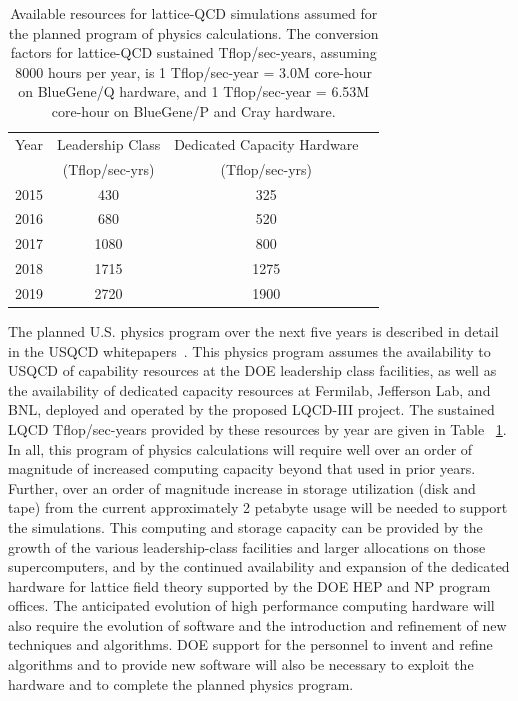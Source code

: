 \begin{table}[t]
\begin{center}
\caption{Available resources for lattice-QCD simulations assumed for the planned program of physics calculations.  The conversion factors for lattice-QCD sustained
Tflop/sec-years, assuming 8000 hours per year, is 1 Tflop/sec-year = 3.0M core-hour on BlueGene/Q hardware, and 1 Tflop/sec-year = 6.53M core-hour on BlueGene/P and Cray hardware. \vspace{1.5mm}}
\label{tab:fiveyear}
\begin{tabular}{lccc}
\hline\hline  
Year & Leadership Class  & Dedicated Capacity Hardware  \\[-0.75mm] 
& (Tflop/sec-yrs) & (Tflop/sec-yrs) \\[0.5mm] \hline
2015 & 430 & 325 \\
2016 & 680 & 520 \\
2017 & 1080 & 800 \\
2018 & 1715 & 1275 \\ 
2019 & 2720 & 1900 \\ \hline\hline
\end{tabular}
\end{center}
\end{table}

The planned U.S. physics program over the next five years is described in detail
in the USQCD
whitepapers~\cite{USQCD_EF_whitepaper13,USQCD_IF_whitepaper13,USQCD_NP_whitepaper13,USQCD_Thermo_whitepaper13}.
This physics program assumes the availability to USQCD of capability resources
at the DOE leadership class facilities, as well as the availability of dedicated
capacity resources at Fermilab, Jefferson Lab, and BNL, deployed and operated
by the proposed LQCD-III project.  The sustained LQCD Tflop/sec-years provided by
these resources by year are given in Table ~\ref{tab:fiveyear}. In all, this
program of physics calculations 
will require well over an order of magnitude of increased computing capacity
beyond that used in prior years.  Further, over an order of magnitude increase
in storage utilization (disk and tape) from the current approximately 2
petabyte usage will be needed to support the simulations.   This computing and
storage capacity can be provided by the growth
of the various leadership-class facilities and larger allocations on those
supercomputers, and by the continued availability and expansion of the
dedicated hardware for lattice field theory supported by the DOE HEP and NP
program offices.  The anticipated evolution of high performance computing
hardware will also require the evolution of software and the introduction and
refinement of new techniques and algorithms.  DOE support for the personnel to
invent and refine algorithms and to provide new software will also be necessary to
exploit the hardware and to complete the planned physics program.

